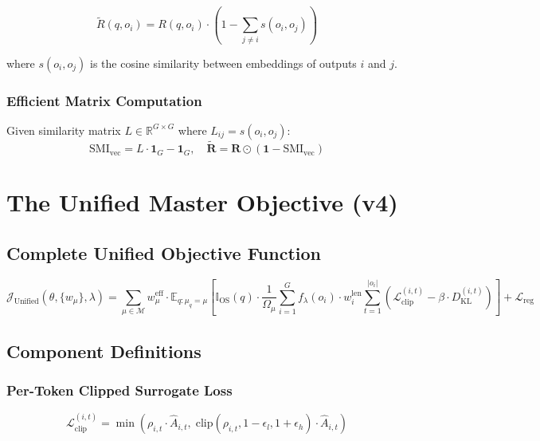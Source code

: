 \documentclass[11pt,a4paper]{article}
\begin{document}
\begin{equation}
\tilde{R}(q, o_i) = R(q, o_i) \cdot \left(1 - \sum_{j \neq i} s(o_i, o_j)\right)
\end{equation}

where $s(o_i, o_j)$ is the cosine similarity between embeddings of outputs $i$ and $j$.

\subsubsection{Efficient Matrix Computation}

Given similarity matrix $L \in \mathbb{R}^{G \times G}$ where $L_{ij} = s(o_i, o_j)$:
\begin{equation}
\text{SMI}_{\text{vec}} = L \cdot \mathbf{1}_G - \mathbf{1}_G, \quad \mathbf{\tilde{R}} = \mathbf{R} \odot (\mathbf{1} - \text{SMI}_{\text{vec}})
\end{equation}

\newpage


\section{The Unified Master Objective (v4)}

\subsection{Complete Unified Objective Function}

\begin{equation}
\boxed{
\mathcal{J}_{\text{Unified}}(\theta, \{w_\mu\}, \lambda) = \sum_{\mu \in \mathcal{M}} w_\mu^{\text{eff}} \cdot \mathbb{E}_{q: \mu_q = \mu} \left[ \mathbb{I}_{\text{OS}}(q) \cdot \frac{1}{\Omega_\mu} \sum_{i=1}^{G} f_\lambda(o_i) \cdot w_i^{\text{len}} \sum_{t=1}^{|o_i|} \left( \mathcal{L}_{\text{clip}}^{(i,t)} - \beta \cdot D_{\text{KL}}^{(i,t)} \right) \right] + \mathcal{L}_{\text{reg}}
}
\end{equation}

\subsection{Component Definitions}

\subsubsection{Per-Token Clipped Surrogate Loss}
\begin{equation}
\mathcal{L}_{\text{clip}}^{(i,t)} = \min\left( \rho_{i,t} \cdot \hat{A}_{i,t}, \; \text{clip}(\rho_{i,t}, 1-\epsilon_l, 1+\epsilon_h) \cdot \hat{A}_{i,t} \right)
\end{equation}
\end{document}
